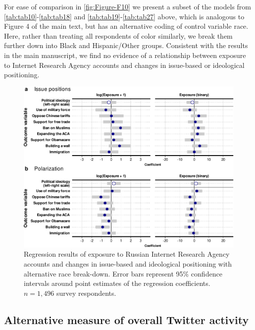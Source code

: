 \documentclass[
  12pt,
]{article}
\begin{document}
For ease of comparison in \autoref{fig:Figure-F10} we present a subset of the models from \ref{tab:tab10}-\ref{tab:tab18} and \ref{tab:tab19}-\ref{tab:tab27} above, which is analogous to Figure 4 of the main text, but has an alternative coding of control variable race. Here, rather than treating all respondents of color similarly, we break them further down into Black and Hispanic/Other groups. Consistent with the results in the main manuscript, we find no evidence of a relationship between exposure to Internet Research Agency accounts and changes in issue-based or ideological positioning.

\begin{figure}
\centering
\includegraphics{Appendix_files/figure-latex/Figure-F10-1.pdf}
\caption{\label{fig:Figure-F10}Regression results of exposure to Russian Internet Research Agency accounts and changes in issue-based and ideological positioning with alternative race break-down. Error bars represent 95\% confidence intervals around point estimates of the regression coefficients. \(n = 1,496\) survey respondents.}
\end{figure}

\clearpage

\hypertarget{alternative-measure-of-overall-twitter-activity-1}{%
\subsection{Alternative measure of overall Twitter activity}\label{alternative-measure-of-overall-twitter-activity-1}}
\end{document}
